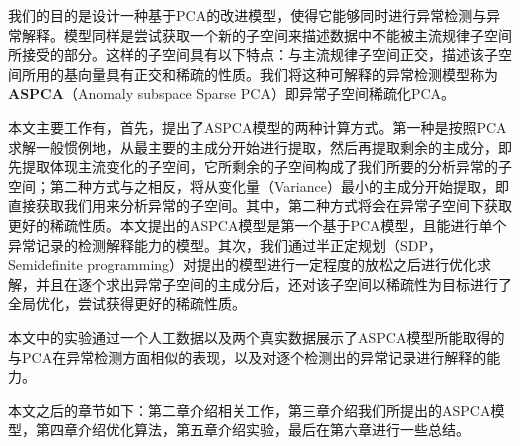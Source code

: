 我们的目的是设计一种基于PCA的改进模型，使得它能够同时进行异常检测与异常解释。模型同样是尝试获取一个新的子空间来描述数据中不能被主流规律子空间所接受的部分。这样的子空间具有以下特点：与主流规律子空间正交，描述该子空间所用的基向量具有正交和稀疏的性质。我们将这种可解释的异常检测模型称为{\bf ASPCA}（Anomaly subspace Sparse PCA）即异常子空间稀疏化PCA。

本文主要工作有，首先，提出了ASPCA模型的两种计算方式。第一种是按照PCA求解一般惯例地，从最主要的主成分开始进行提取，然后再提取剩余的主成分，即先提取体现主流变化的子空间，它所剩余的子空间构成了我们所要的分析异常的子空间；第二种方式与之相反，将从变化量（Variance）最小的主成分开始提取，即直接获取我们用来分析异常的子空间。其中，第二种方式将会在异常子空间下获取更好的稀疏性质。本文提出的ASPCA模型是第一个基于PCA模型，且能进行单个异常记录的检测解释能力的模型。其次，我们通过半正定规划（SDP，Semidefinite programming）对提出的模型进行一定程度的放松之后进行优化求解，并且在逐个求出异常子空间的主成分后，还对该子空间以稀疏性为目标进行了全局优化，尝试获得更好的稀疏性质。

本文中的实验通过一个人工数据以及两个真实数据展示了ASPCA模型所能取得的与PCA在异常检测方面相似的表现，以及对逐个检测出的异常记录进行解释的能力。

本文之后的章节如下：第二章介绍相关工作，第三章介绍我们所提出的ASPCA模型，第四章介绍优化算法，第五章介绍实验，最后在第六章进行一些总结。


